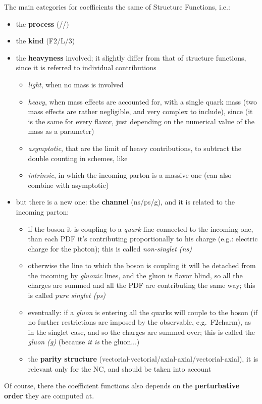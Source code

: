 The main categories for coefficients the same of Structure Functions, i.e.:
\begin{itemize}
\item the \textbf{process} (\elmag/\nc/\cc)
\item the \textbf{kind} (F2/L/3)
\item the \textbf{heavyness} involved; it slightly differ from that of
  structure functions, since it is referred to individual contributions
  \begin{itemize}
    \item \textit{light}, when no mass is involved
    \item \textit{heavy}, when mass effects are accounted for, with a single
      quark mass (two mass effects are rather negligible, and very complex to
      include), since (it is the same for every flavor, just depending on the
      numerical value of the mass as a parameter)
    \item \textit{asymptotic}, that are the limit of heavy contributions, to
      subtract the double counting in \gmvfns schemes, like \fonll
    \item \textit{intrinsic}, in which the incoming parton is a massive one
      (can also combine with asymptotic)
  \end{itemize}
\item but there is a new one: the \textbf{channel} (ns/ps/g), and it is related to the
  incoming parton:
  \begin{itemize}
    \item if the \ew boson it is coupling to a \textit{quark} line connected to the incoming
      one, than each PDF it's contributing proportionally to his charge (e.g.:
      electric charge for the photon); this is called \textit{non-singlet (ns)}
    \item otherwise the line to which the \ew boson is coupling it will be detached
      from the incoming  by \textit{gluonic} lines, and the gluon is flavor blind, so
      all the charges are summed and all the PDF are contributing the same way;
      this is called \textit{pure singlet (ps)}
    \item eventually: if a \textit{gluon} is entering all the quarks will couple to the \ew
      boson (if no further restrictions are imposed by the observable, e.g.\
      F2charm), as in the singlet case, and so the charges are summed over; this
      is called the \textit{gluon (g)} (because \textit{it is} the gluon...)
    \item the \textbf{parity structure}
      (vectorial-vectorial/axial-axial/vectorial-axial), it is relevant only for
      the NC, and should be taken into account
  \end{itemize}
\end{itemize}
Of course, there the coefficient functions also depends on the
\textbf{perturbative order} they are computed at.

